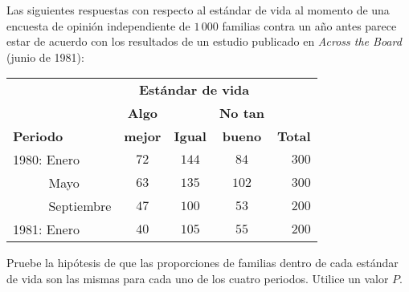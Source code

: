 \begin{enunciado}
 Las siguientes respuestas con respecto al est\'andar de vida al momento
 de una encuesta de opini\'on independiente de $1\,000$ familias
 contra un a\~no antes parece estar de acuerdo con los resultados
 de un estudio publicado en \textit{Across the Board} (junio de 1981):
 \begin{center}
  \begin{tabular}{lcccr}
   & \multicolumn{3}{c}{\textbf{Est\'andar de vida}} & \\
   \cline{2-4}
   & \textbf{Algo} & & \textbf{No tan} & \\
   \textbf{Periodo} & \textbf{mejor} & \textbf{Igual} & \textbf{bueno} &
   \textbf{Total} \\
   \hline
   1980: Enero & $72$ & $144$ & $84$ & $300$ \\
   $\phantom{1980:}$ Mayo & $63$ & $135$ & $102$ & $300$ \\
   $\phantom{1980:}$ Septiembre & $47$ & $100$ & $53$ & $200$ \\
   1981: Enero & $40$ & $105$ & $55$ & $200$
  \end{tabular}
 \end{center}
 Pruebe la hip\'otesis
 de que las proporciones de familias dentro de cada est\'andar de vida
 son las mismas para cada uno de los cuatro periodos.
 Utilice un valor $P$.
\end{enunciado}

